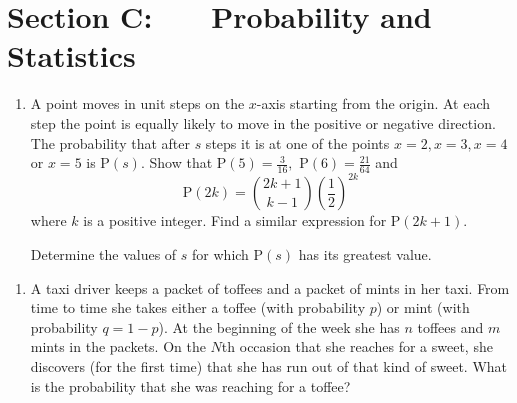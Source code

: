 \documentclass[a4, 11pt]{report}
\newlength{\qspace}
\newcounter{qnumber}
\newenvironment{question}%
 {\vspace{\qspace}
  \begin{enumerate}[\bfseries 1\quad][10]%
    \setcounter{enumi}{\value{qnumber}}%
    \item%
 }
{
  \end{enumerate}
  \filbreak
  \stepcounter{qnumber}
 }
\begin{document}
	\newpage
\section*{Section C: \ \ \ Probability and Statistics}


\begin{question}
A point moves in unit steps on the $x$-axis starting from the origin.
At each step the point is equally likely to move in the positive or
negative direction. The probability that after $s$ steps it is at
one of the points $x=2,x=3,x=4$ or $x=5$ is $\mathrm{P}(s).$ Show
that $\mathrm{P}(5)=\frac{3}{16},$ $\mathrm{P}(6)=\frac{21}{64}$
and 
\[
\mathrm{P}(2k)=\binom{2k+1}{k-1}\left(\frac{1}{2}\right)^{2k}
\]
where $k$ is a positive integer. Find a similar expression for $\mathrm{P}(2k+1).$ 


Determine the values of $s$ for which $\mathrm{P}(s)$ has its greatest
value. 
\end{question}

\begin{question}

A taxi driver keeps a packet of toffees and a packet of mints in her
taxi. From time to time she takes either a toffee (with probability
$p$) or mint (with probability $q=1-p$). At the beginning of the
week she has $n$ toffees and $m$ mints in the packets. On the $N$th
occasion that she reaches for a sweet, she discovers (for the first
time) that she has run out of that kind of sweet. What is the probability
that she was reaching for a toffee?
\end{question}
\end{document}
